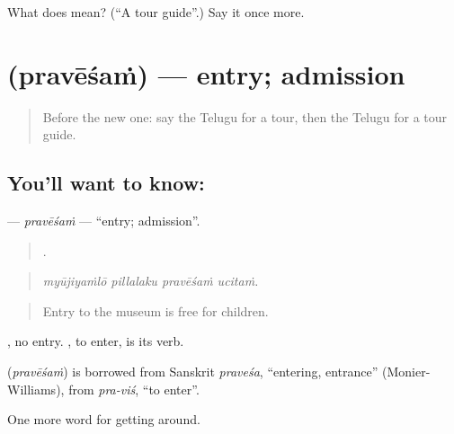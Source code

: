 \begin{tcolorbox}[breakable,colback=teal!4,colframe=teal!35!black,title={Before you move on}]
What does  mean? (\textquotedblleft{}A tour guide\textquotedblright{}.) Say it once more.
\end{tcolorbox}
\section[\texorpdfstring{\te{ప్రవేశం} (pravēśaṁ)}{ప్రవేశం (pravēśaṁ)}]{ (pravēśaṁ) — entry; admission}

\label{lesson:TE-C455-pravesam}



\begin{quote}
Before the new one: say the Telugu for a tour, then the Telugu for a tour guide.
\end{quote}

\subsection*{You'll want to know: }
\textbf{} — \emph{pravēśaṁ} — \textquotedblleft{}entry; admission\textquotedblright{}.

\begin{quote}
   .
\end{quote}

\begin{quote}
\emph{myūjiyaṁlō pillalaku pravēśaṁ ucitaṁ.}
\end{quote}

\begin{quote}
Entry to the museum is free for children.
\end{quote}

 , no entry. , to enter, is its verb.

\begin{cousinweb}
\textbf{} (\emph{pravēśaṁ}) is borrowed from Sanskrit \emph{praveśa}, \textquotedblleft{}entering, entrance\textquotedblright{} (Monier-Williams), from \emph{pra-viś}, \textquotedblleft{}to enter\textquotedblright{}.
\end{cousinweb}

\begin{grammarlens}[title={What you've built}]
One more word for getting around.
\end{grammarlens}

